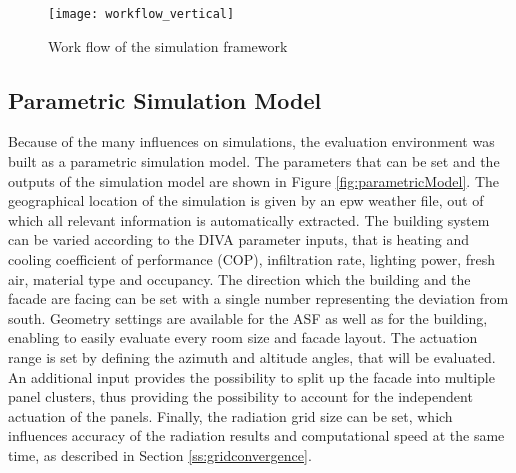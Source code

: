 
			\begin{figure}[ht] %
				\begin{center}
				\texttt{[image: workflow\_vertical]}
				\caption{Work flow of the simulation framework}
				\label{fig:workflow}
				\end{center} 
			\end{figure}

			

		\subsection{Parametric Simulation Model}

			Because of the many influences on simulations, the evaluation environment was built as a parametric simulation model. The parameters that can be set and the outputs of the simulation model are shown in Figure \ref{fig:parametricModel}. The geographical location of the simulation is given by an epw weather file, out of which all relevant information is automatically extracted. The building system can be varied according to the DIVA parameter inputs, that is heating and cooling coefficient of performance (COP), infiltration rate, lighting power, fresh air, material type and occupancy. The direction which the building and the facade are facing can be set with a single number representing the deviation from south. Geometry settings are available for the ASF as well as for the building, enabling to easily evaluate every room size and facade layout. The actuation range is set by defining the azimuth and altitude angles, that will be evaluated. An additional input provides the possibility to split up the facade into multiple panel clusters, thus providing the possibility to account for the independent actuation of the panels. Finally, the radiation grid size can be set, which influences accuracy of the radiation results and computational speed at the same time, as described in Section \ref{ss:gridconvergence}. 

